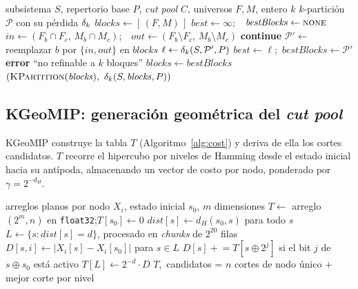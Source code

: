 \documentclass[11pt,letterpaper]{article}
\begin{document}
\begin{algorithm}[H]
	\caption{\textsc{GreedyKPartition} — motor voraz compartido}
	\label{alg:greedy}
	\begin{algorithmic}[1]
		\Require subsistema $S$, repertorio base $P$, \emph{cut pool} $C$, universos $F,M$, entero $k$
		\Ensure $k$-partición $\mathcal{P}$ con su pérdida $\delta_k$
		\State $\mathit{blocks} \gets [\,(F, M)\,]$ 
		\State $\mathit{best} \gets \infty$;\ \ $\mathit{bestBlocks} \gets \textsc{none}$
		\State $\mathit{in} \gets (F_b\cap F_c,\, M_b\cap M_c)$;\ \ $\mathit{out} \gets (F_b\setminus F_c,\, M_b\setminus M_c)$
		 \textbf{continue} \EndIf
		\State $\mathcal{P}' \gets$ reemplazar $b$ por $\{\mathit{in},\mathit{out}\}$ en $\mathit{blocks}$
		\State $\ell \gets \delta_k(S, \mathcal{P}', P)$ 
		 $\mathit{best}\gets \ell$;\ $\mathit{bestBlocks}\gets \mathcal{P}'$ \EndIf
		\EndFor
		\EndFor
		 \textbf{error} ``no refinable a $k$ bloques'' \EndIf
		\State $\mathit{blocks} \gets \mathit{bestBlocks}$
		\EndWhile
		\State \Return $(\textsc{KPartition}(\mathit{blocks}),\ \dk(S,\mathit{blocks},P))$
	\end{algorithmic}
\end{algorithm}

\subsection{KGeoMIP: generación geométrica del \emph{cut pool}}
KGeoMIP construye la tabla $T$ (Algoritmo~\ref{alg:cost}) y deriva de ella los
cortes candidatos. $T$ recorre el hipercubo por niveles de Hamming desde el
estado inicial hacia su antípoda, almacenando un vector de costo por nodo,
ponderado por $\gamma = 2^{-d_H}$.

\begin{algorithm}[H]
	\caption{\textsc{CostTable} — tabla de costos $T$, vectorizada por niveles}
	\label{alg:cost}
	\begin{algorithmic}[1]
		\Require arreglos planos por nodo $X_i$, estado inicial $s_0$, $m$ dimensiones
		\State $T \gets$ arreglo $(2^m, n)$ en \texttt{float32};\quad $T[s_0] \gets 0$
		\State $\mathit{dist}[s] \gets d_H(s_0, s)$ para todo $s$ 
		 
		\State $L \gets \{s : \mathit{dist}[s]=d\}$, procesado en \emph{chunks} de $2^{20}$ filas
		\State $D[s,i] \gets |X_i[s] - X_i[s_0]|$ para $s \in L$ 
		 $D[s] \mathrel{+}= T[s \oplus 2^j]$ si el bit $j$ de $s \oplus s_0$ está activo \EndFor
		\EndIf
		\State $T[L] \gets 2^{-d} \cdot D$
		\EndFor
		\State \Return $T$,\ candidatos = $n$ cortes de nodo único $+$ mejor corte por nivel
	\end{algorithmic}
\end{algorithm}
\end{document}
